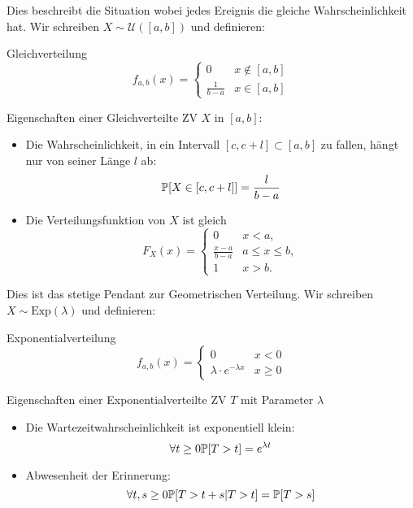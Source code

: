Dies beschreibt die Situation wobei jedes Ereignis die gleiche Wahrscheinlichkeit hat. Wir schreiben $X \sim \mathcal{U}([a,b])$ und definieren:
\begin{mainbox}{Gleichverteilung}
$$f_{a,b}(x) = \begin{cases}
    0 & x \notin [a,b] \\
    \frac{1}{b-a} & x \in [a,b]
\end{cases}$$
\end{mainbox}
\begin{subbox}{Eigenschaften einer Gleichverteilte ZV $X$ in $[a, b]$:}
    \begin{itemize}
        \item Die Wahrscheinlichkeit, in ein Intervall $[c, c + l] \subset [a, b]$ zu fallen, hängt nur von seiner Länge $l$ ab:
        $$\mathbb{P}[X \in [c, c+l]] = \frac{l}{b-a}$$
        \item Die Verteilungsfunktion von $X$ ist gleich
        $$F_X(x) = \begin{cases}
            0 & x < a, \\
            \frac{x-a}{b-a} & a \leq x \leq b, \\
            1 & x > b.
        \end{cases}$$
    \end{itemize}
\end{subbox}

 Dies ist das stetige Pendant zur Geometrischen Verteilung. Wir schreiben $X \sim \text{Exp}(\lambda)$ und definieren:
\begin{mainbox}{Exponentialverteilung}
    $$f_{a,b}(x) = \begin{cases}
        0 &x < 0 \\
       \lambda \cdot e^{-\lambda x} & x \geq 0
    \end{cases}$$
\end{mainbox}

\begin{subbox}{Eigenschaften einer Exponentialverteilte ZV $T$ mit Parameter $\lambda$}
    \begin{itemize}
        \item Die Wartezeitwahrscheinlichkeit ist exponentiell klein:
        $$\forall t \geq 0 \mathbb{P}[T > t] = e^{\lambda t}$$
        \item Abwesenheit der Erinnerung:
        $$\forall t, s\geq 0 \mathbb{P}[T > t + s|T > t] = \mathbb{P}[T > s]$$
    \end{itemize}
\end{subbox}


